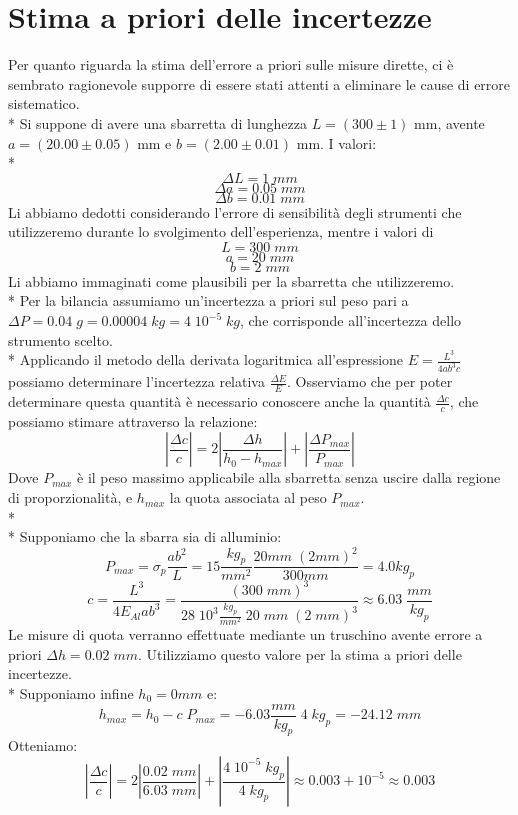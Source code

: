 \documentclass[10pt,a4paper]{book}
\begin{document}
\section*{Stima a priori delle incertezze}
Per quanto riguarda la stima dell'errore a priori sulle misure dirette, ci è sembrato ragionevole supporre di essere stati attenti a eliminare le cause di errore sistematico.\\*
Si suppone di avere una sbarretta di lunghezza $L = (300 \pm 1)$ mm, avente $a = (20.00 \pm 0.05)$ mm e $b = (2.00 \pm 0.01)$ mm. I valori:\\*
$$
\Delta L = 1\;mm
$$
$$
\Delta a = 0.05\;mm
$$
$$
\Delta b = 0.01\;mm
$$
Li abbiamo dedotti considerando l'errore di sensibilità degli strumenti che utilizzeremo durante lo svolgimento dell'esperienza, mentre i valori di
$$
L = 300\;mm
$$
$$
a = 20\;mm
$$
$$
b = 2\;mm
$$
Li abbiamo immaginati come plausibili per la sbarretta che utilizzeremo.\\*
Per la bilancia assumiamo un'incertezza a priori sul peso pari a $\Delta P = 0.04\;g = 0.00004\;kg = 4\;10^{-5}\;kg$, che corrisponde all'incertezza dello strumento scelto.\\*
Applicando il metodo della derivata logaritmica all'espressione $ E = \frac{L^3}{4ab^3c} $ possiamo determinare l'incertezza relativa $\frac{\Delta E}{E}$. 
Osserviamo che per poter determinare questa quantità è necessario conoscere anche la quantità $\frac{\Delta c}{c}$, che possiamo stimare attraverso la relazione:
$$
\left|\frac{\Delta c}{c}\right| = 2 \left|\frac{\Delta h}{h_0 - h_{max}}\right| + \left|\frac{\Delta P_{max}}{P_{max}}\right|
$$
Dove $P_{max}$ è il peso massimo applicabile alla sbarretta senza uscire dalla regione di proporzionalità, e $h_{max}$ la quota associata al peso $P_{max}$.\\*\\*
Supponiamo che la sbarra sia di alluminio:
$$
P_{max} = \sigma_p \frac{ab^2}{L} = 15 \frac{kg_p}{mm^2} \frac{20mm\;(2mm)^2}{300mm} = 4.0 kg_p
$$
$$
c = \frac{L^3}{4E_{Al}ab^3} = \frac{(300\;mm)^3}{28\;10^3\frac{kg_p}{mm^2}\;20\;mm\;(2\;mm)^3} \approx 6.03\;\frac{mm}{kg_p}
$$
Le misure di quota verranno effettuate mediante un truschino avente errore a priori $\Delta h = 0.02\;mm$. Utilizziamo questo valore per la stima a priori delle incertezze.\\*
Supponiamo infine $h_0 = 0 mm$ e:
$$
h_{max} = h_0 - c\;P_{max} = -6.03\frac{mm}{kg_p}\;4\;kg_p = -24.12\;mm
$$
Otteniamo:
$$
\left|\frac{\Delta c}{c}\right| = 2 \left|\frac{0.02\;mm}{6.03\;mm}\right| + \left|\frac{4\;10^{-5}\;kg_p}{4\;kg_p}\right| \approx 0.003 + 10^{-5} \approx 0.003
$$
\end{document}
